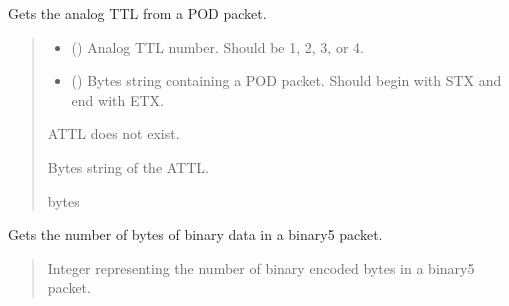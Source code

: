 \documentclass[letterpaper,10pt,english]{sphinxmanual}
\begin{document}
\begin{fulllineitems}
\begin{fulllineitems}
\label{\detokenize{Morelia.Packets:Morelia.Packets.Binary5.PacketBinary5.GetAnalogTTL}}
\pysigstartsignatures
{}
\pysigstopsignatures
\sphinxAtStartPar
Gets the analog TTL from a POD packet.
\begin{quote}\begin{description}
\begin{itemize}
\item {} 
\sphinxAtStartPar
{} () \textendash{} Analog TTL number. Should be 1, 2, 3, or 4.

\item {} 
\sphinxAtStartPar
{} () \textendash{} Bytes string containing a POD packet. Should begin with STX and                 end with ETX.

\end{itemize}

\sphinxAtStartPar
{} \textendash{} ATTL does not exist.

\sphinxAtStartPar
Bytes string of the ATTL.

\sphinxAtStartPar
bytes

\end{description}\end{quote}

\end{fulllineitems}


\begin{fulllineitems}
\label{\detokenize{Morelia.Packets:Morelia.Packets.Binary5.PacketBinary5.GetBinaryLength}}
\pysigstartsignatures
{}
\pysigstopsignatures
\sphinxAtStartPar
Gets the number of bytes of binary data in a binary5 packet.
\begin{quote}\begin{description}
\sphinxAtStartPar
Integer representing the number of binary encoded bytes in a binary5 packet.


\end{description}
\end{quote}
\end{fulllineitems}
\end{fulllineitems}
\end{document}
